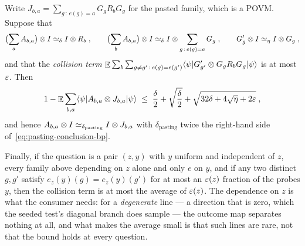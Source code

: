 \begin{lemma}
\begin{itemize}
\end{itemize}
Write $J_{b, a} = \sum_{g \,:\, e(g) = a} G_g R_b G_g$ for the pasted family, which is a POVM.
Suppose that
\begin{equation}
  \label{eq:pasting-hyp-bp}
  \bigl(\sum_a A_{b,a}\bigr) \otimes I \simeq_\delta I \otimes R_b\;, \qquad
  \bigl(\sum_b A_{b,a}\bigr) \otimes I \simeq_\delta
    I \otimes \sum_{g \,:\, e(g) = a} G_g\;, \qquad
  G'_g \otimes I \simeq_\eta I \otimes G_g\;,
\end{equation}
and that the \emph{collision term}
$\mathop{\mathbb{E}} \sum_b \sum_{g \neq g' \,:\, e(g) = e(g')}
  \langle\psi| G'_{g'} \otimes G_g R_b G_g |\psi\rangle$ is at most $\varepsilon$. Then
\begin{equation}
  \label{eq:pasting-conclusion-bp}
  1 - \mathop{\mathbb{E}} \sum_{b, a} \langle\psi| A_{b,a} \otimes J_{b,a} |\psi\rangle
    \;\leq\; \frac{\delta}{2} + \sqrt{\frac{\delta}{2}}
      + \sqrt{32 \delta + 4\sqrt{\eta} + 2 \varepsilon}\;,
\end{equation}
and hence $A_{b,a} \otimes I \simeq_{\delta_{\mathrm{pasting}}} I \otimes J_{b,a}$ with
$\delta_{\mathrm{pasting}}$ twice the right-hand side of~\eqref{eq:pasting-conclusion-bp}.

Finally, if the question is a pair $(z, y)$ with $y$ uniform and independent of $z$, every family
above depending on $z$ alone and only $e$ on $y$, and if any two distinct $g, g'$ satisfy
$e_z(y)(g) = e_z(y)(g')$ for at most an $\varepsilon(z)$ fraction of the probes $y$, then the collision
term is at most the average of $\varepsilon(z)$. The dependence on $z$ is what the consumer needs: for a
\emph{degenerate} line --- a direction that is zero, which the seeded test's diagonal branch does
sample --- the outcome map separates nothing at all, and what makes the average small is that such
lines are rare, not that the bound holds at every question.
\end{lemma}

